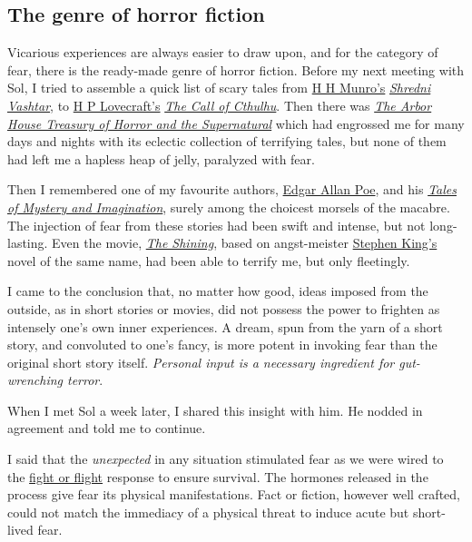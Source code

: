\documentclass[
  a4paper,
]{article}
\begin{document}
\subsection{The genre of horror
fiction}\label{the-genre-of-horror-fiction}

Vicarious experiences are always easier to draw upon, and for the
category of fear, there is the ready-made genre of horror fiction.
Before my next meeting with Sol, I tried to assemble a quick list of
scary tales from
\href{https://americanliterature.com/author/hh-munro-saki}{H H Munro's}
\href{https://www.classicshorts.com/stories/vashtar.html}{\emph{Shredni
Vashtar}}, to \href{https://www.hplovecraft.com/}{H P Lovecraft's}
\href{https://www.hplovecraft.com/writings/texts/fiction/cc.aspx}{\emph{The
Call of Cthulhu}}. Then there was
\href{https://openlibrary.org/books/OL4122966M/The_Arbor_House_treasury_of_horror_and_the_supernatural}{\emph{The
Arbor House Treasury of Horror and the Supernatural}} which had
engrossed me for many days and nights with its eclectic collection of
terrifying tales, but none of them had left me a hapless heap of jelly,
paralyzed with fear.

Then I remembered one of my favourite authors,
\href{https://www.poetryfoundation.org/poets/edgar-allan-poe}{Edgar
Allan Poe}, and his
\href{https://www.amazon.in/Tales-Mystery-Imagination-Collins-Classics/dp/0007420226}{\emph{Tales
of Mystery and Imagination}}, surely among the choicest morsels of the
macabre. The injection of fear from these stories had been swift and
intense, but not long-lasting. Even the movie,
\href{https://www.imdb.com/title/tt0081505/}{\emph{The Shining}}, based
on angst-meister
\href{https://www.britannica.com/biography/Stephen-King}{Stephen King's}
novel of the same name, had been able to terrify me, but only
fleetingly.

I came to the conclusion that, no matter how good, ideas imposed from
the outside, as in short stories or movies, did not possess the power to
frighten as intensely one's own inner experiences. A dream, spun from
the yarn of a short story, and convoluted to one's fancy, is more potent
in invoking fear than the original short story itself. \emph{Personal
input is a necessary ingredient for gut-wrenching terror}.

When I met Sol a week later, I shared this insight with him. He nodded
in agreement and told me to continue.

I said that the \emph{unexpected} in any situation stimulated fear as we
were wired to the
\href{https://www.verywellmind.com/what-is-the-fight-or-flight-response-2795194}{fight
or flight} response to ensure survival. The hormones released in the
process give fear its physical manifestations. Fact or fiction, however
well crafted, could not match the immediacy of a physical threat to
induce acute but short-lived fear.
\end{document}
